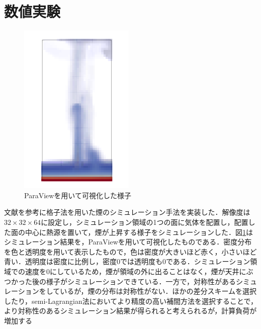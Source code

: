 \documentclass[10pt,a4paper,notitlepage,oneside,twocolumn]{abst_jsarticle}
\begin{document}
\section{数値実験}
\begin{figure}[h]
\begin{center}
\includegraphics[width=55mm]{center_smoke.png}
\caption{ParaViewを用いて可視化した様子}
\label{fig:fig1}
\end{center}
\end{figure}
文献\cite{fedkiew}を参考に格子法を用いた煙のシミュレーション手法を実装した．解像度は$32\times32\times64$に設定し，シミュレーション領域の1つの面に気体を配置し，配置した面の中心に熱源を置いて，煙が上昇する様子をシミュレーションした．図\ref{fig:fig1}はシミュレーション結果を，ParaViewを用いて可視化したものである．密度分布を色と透明度を用いて表示したもので，色は密度が大きいほど赤く，小さいほど青い．透明度は密度に比例し，密度$0$では透明度も$0$である．シミュレーション領域での速度を0にしているため，煙が領域の外に出ることはなく，煙が天井にぶつかった後の様子がシミュレーションできている．一方で，対称性があるシミュレーションをしているが，煙の分布は対称性がない．ほかの差分スキームを選択したり，semi-Lagrangian法においてより精度の高い補間方法を選択することで，より対称性のあるシミュレーション結果が得られると考えられるが，計算負荷が増加する
\end{document}
